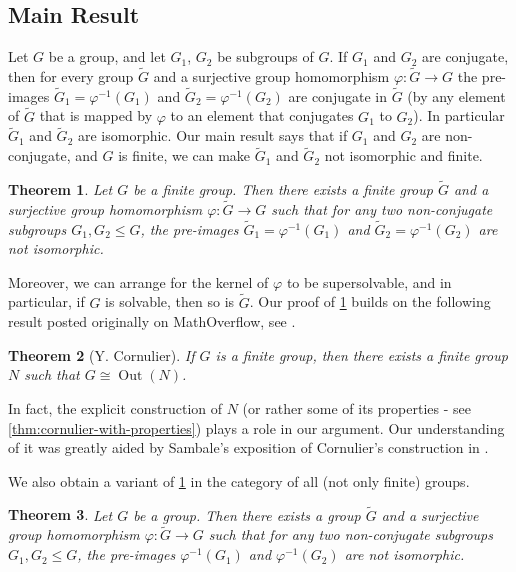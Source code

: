 \documentclass[11pt]{amsart}
\newtheorem{thm}{Theorem}[section]
\numberwithin{equation}{section}
\begin{document}
\subsection{Main Result}

Let $G$ be a group, and let $G_1$, $G_2$ be subgroups of $G$. If $G_1$ and $G_2$ are conjugate, then for every group $\widetilde G$ and a surjective group homomorphism $\varphi \colon \widetilde G \to G$ the pre-images $\widetilde G_1 = \varphi^{-1}(G_1)$ and $\widetilde G_2 = \varphi^{-1}(G_2)$ are conjugate in $\widetilde G$ (by any element of $\widetilde G$ that is mapped by $\varphi$ to an element that conjugates $G_1$ to $G_2$). In particular $\widetilde G_1$ and $\widetilde G_2$ are isomorphic. Our main result says that if $G_1$ and $G_2$ are non-conjugate, and $G$ is finite, we can make $\widetilde G_1$ and $\widetilde G_2$ not isomorphic and finite.

\begin{thm} \label{MainRes}
Let $G$ be a finite group. Then there exists a finite group $\widetilde G$ and a surjective group homomorphism $\varphi \colon \widetilde G \to G$ such that for any two non-conjugate subgroups $G_1, G_2 \le G$, the pre-images $\widetilde G_1 = \varphi^{-1}(G_1)$ and $\widetilde G_2 = \varphi^{-1}(G_2) $ are not isomorphic.
\end{thm}

Moreover, we can arrange for the kernel of $\varphi$ to be supersolvable, and in particular, if $G$ is solvable, then so is $\widetilde G$. Our proof of \cref{MainRes} builds on the following result posted originally on MathOverflow, see \cite{cornulier-original}.

\begin{thm}[Y. Cornulier]\label{thm:cornulier} 
If $G$ is a finite group, then there exists a finite group $N$ such that $G \cong \operatorname{Out}(N)$.
\end{thm}

In fact, the explicit construction of $N$ (or rather some of its properties - see \cref{thm:cornulier-with-properties}) plays a role in our argument.  Our understanding of it was greatly aided by Sambale's exposition of Cornulier's construction in \cite{group-theoretic-cornulier}.

We also obtain a variant of \cref{MainRes} in the category of all (not only finite) groups.

\begin{thm} \label{thm:main:infinite}
Let $G$ be a group. Then there exists a group $\widetilde G$ and a surjective group homomorphism $\varphi \colon \widetilde G \to G$ such that for any two non-conjugate subgroups $G_1,G_2 \le G$, the pre-images $\varphi^{-1}(G_1)$ and $\varphi^{-1}(G_2) $ are not isomorphic.
\end{thm}
\end{document}
